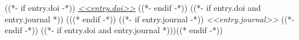 {
    ((*- if entry.doi -*))
    \small\textit{\href{<<entry.doi_url>>}{<<entry.doi>>}}
    ((*- endif -*))
    ((*- if entry.doi and entry.journal *)) (((* endif -*))
    ((*- if entry.journal -*))
    \small\textit{<<entry.journal>>}
    ((*- endif -*))
    ((*- if entry.doi and entry.journal *)))((* endif -*))
}
\resumeItemListStart
\resumeItemListEnd